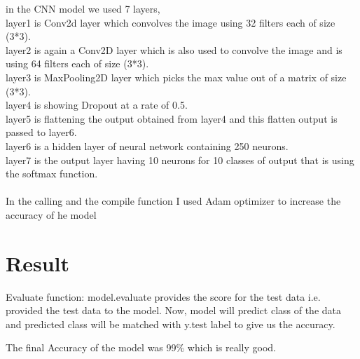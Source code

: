 \documentclass[fleqn,10pt]{SelfArx} %
\begin{document}
in the CNN model we used 7 layers, \\
layer1 is Conv2d layer which convolves the image using 32 filters each of size (3*3). \\
layer2 is again a Conv2D layer which is also used to convolve the image and is using 64 filters each of size (3*3). \\
layer3 is MaxPooling2D layer which picks the max value out of a matrix of size (3*3). \\
layer4 is showing Dropout at a rate of 0.5. \\
layer5 is flattening the output obtained from layer4 and this flatten output is passed to layer6. \\
layer6 is a hidden layer of neural network containing 250 neurons. \\
layer7 is the output layer having 10 neurons for 10 classes of output that is using the softmax function.\\ \\

In the calling and the compile function I used Adam optimizer to increase the accuracy of he model
\section{Result}

Evaluate function: 
model.evaluate provides the score for the test data i.e. provided the test data to the model. Now, model will predict class of the data and predicted class will be matched with y.test label to give us the accuracy. 

The final Accuracy of the model was 99\% which is really good.

\end{document}
